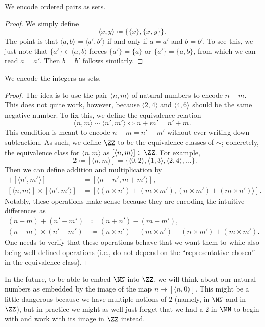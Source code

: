 \begin{exe}
	We encode ordered pairs as sets.
\end{exe}
\begin{proof}
	We simply define
	\[\langle x,y\rangle\coloneqq\{\{x\},\{x,y\}\}.\]
	The point is that $\langle a,b\rangle=\langle a',b'\rangle$ if and only if $a=a'$ and $b=b'$. To see this, we just note that $\{a'\}\in\langle a,b\rangle$ forces $\{a'\}=\{a\}$ or $\{a'\}=\{a,b\}$, from which we can read $a=a'$. Then $b=b'$ follows similarly.
\end{proof}
\begin{exe}
	We encode the integers as sets.
\end{exe}
\begin{proof}
	The idea is to use the pair $\langle n,m\rangle$ of natural numbers to encode $n-m$. This does not quite work, however, because $\langle2,4\rangle$ and $\langle4,6\rangle$ should be the same negative number. To fix this, we define the equivalence relation
	\[\langle n,m\rangle\sim\langle n',m'\rangle\iff n+m'=n'+m.\]
	This condition is meant to encode $n-m=n'-m'$ without ever writing down subtraction. As such, we define $\ZZ$ to be the equivalence classes of $\sim$; concretely, the equivalence class for $\langle n,m\rangle$ as $[\langle n,m\rangle]\in\ZZ$. For example,
	\[-2\coloneqq[\langle n,m\rangle]=\{\langle0,2\rangle,\langle1,3\rangle,\langle2,4\rangle,\ldots\}.\]
	Then we can define addition and multiplication by
	\begin{align*}
		[\langle n,m\rangle]+[\langle n',m'\rangle] &= [\langle n+n',m+m'\rangle], \\
		[\langle n,m\rangle]\times[\langle n',m'\rangle] &= [\langle (n\times n')+(m\times m'),(n\times m')+(m\times n')\rangle].
	\end{align*}
	Notably, these operations make sense because they are encoding the intuitive differences as
	\begin{align*}
		(n-m)+(n'-m') &\coloneqq (n+n')-(m+m'), \\
		(n-m)\times(n'-m') &\coloneqq (n\times n')-(m\times n')-(n\times m')+(m\times m').
	\end{align*}
	One needs to verify that these operations behave that we want them to while also being well-defined operations (i.e., do not depend on the ``representative chosen'' in the equivalence class).
\end{proof}
\begin{remark}
	In the future, to be able to embed $\NN$ into $\ZZ$, we will think about our natural numbers as embedded by the image of the map $n\mapsto[\langle n,0\rangle]$. This might be a little dangerous because we have multiple notions of $2$ (namely, in $\NN$ and in $\ZZ$), but in practice we might as well just forget that we had a $2$ in $\NN$ to begin with and work with its image in $\ZZ$ instead.
\end{remark}
